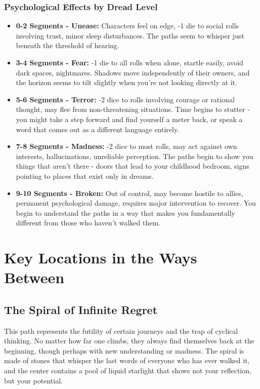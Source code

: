 \documentclass[11pt]{article}
\begin{document}
\subsubsection{Psychological Effects by Dread Level}

\begin{itemize}
\item \textbf{0-2 Segments - Unease:} Characters feel on edge, -1 die to social rolls involving trust, minor sleep disturbances. The paths seem to whisper just beneath the threshold of hearing.
\item \textbf{3-4 Segments - Fear:} -1 die to all rolls when alone, startle easily, avoid dark spaces, nightmares. Shadows move independently of their owners, and the horizon seems to tilt slightly when you're not looking directly at it.
\item \textbf{5-6 Segments - Terror:} -2 dice to rolls involving courage or rational thought, may flee from non-threatening situations. Time begins to stutter - you might take a step forward and find yourself a meter back, or speak a word that comes out as a different language entirely.
\item \textbf{7-8 Segments - Madness:} -2 dice to most rolls, may act against own interests, hallucinations, unreliable perception. The paths begin to show you things that aren't there - doors that lead to your childhood bedroom, signs pointing to places that exist only in dreams.
\item \textbf{9-10 Segments - Broken:} Out of control, may become hostile to allies, permanent psychological damage, requires major intervention to recover. You begin to understand the paths in a way that makes you fundamentally different from those who haven't walked them.
\end{itemize}

\section{Key Locations in the Ways Between}

\subsection{The Spiral of Infinite Regret}

This path represents the futility of certain journeys and the trap of cyclical thinking. No matter how far one climbs, they always find themselves back at the beginning, though perhaps with new understanding or madness. The spiral is made of stones that whisper the last words of everyone who has ever walked it, and the center contains a pool of liquid starlight that shows not your reflection, but your potential.
\end{document}
